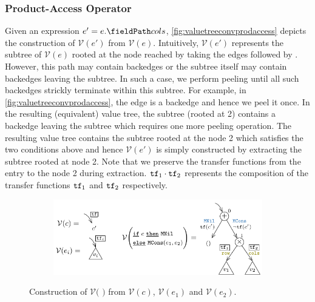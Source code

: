 \subsubsection{Product-Access Operator}
Given an expression $e' = \prodAccess{e}{cols}$,
\cref{fig:valuetreeconvprodaccess} depicts the construction of $\mathcal{V}(e')$
from $\mathcal{V}(e)$.
Intuitively, $\mathcal{V}(e')$ represents the subtree of $\mathcal{V}(e)$ rooted at the \sumn{} node reached by taking
the edges  followed by .
However, this path may contain backedges or the subtree itself may contain backedges leaving the subtree.
In such a case, we perform peeling until all such backedges strickly terminate within this subtree.
For example, in \cref{fig:valuetreeconvprodaccess}, the edge  is a backedge and hence we peel it once.
In the resulting (equivalent) value tree, the subtree (rooted at 2) contains a backedge leaving the subtree which requires
one more peeling operation.
The resulting value tree contains the subtree rooted at the \sumn{} node 2 which satisfies the two conditions above and
hence $\mathcal{V}(e')$ is simply constructed by extracting the subtree rooted at \sumn{} node 2.
Note that we preserve the transfer functions from the entry to the \sumn{} node 2 during extraction.
${\tt tf}{}_1 \cdot {\tt tf}{}_2$ represents the composition of the transfer functions ${\tt tf}{}_1$ and ${\tt tf}{}_2$ respectively.

\begin{figure}[H]
\begin{subfigure}[b]{\textwidth}
\begin{center}
\includegraphics[scale=1.3]{chapters/figures/figValueTreeConvIte.pdf}
\end{center}
\end{subfigure}
\caption{\label{fig:valuetreeconvite} Construction of $\mathcal{V}($    $)$ from $\mathcal{V}(c)$, $\mathcal{V}(e_1)$ and $\mathcal{V}(e_2)$.}
\end{figure}

